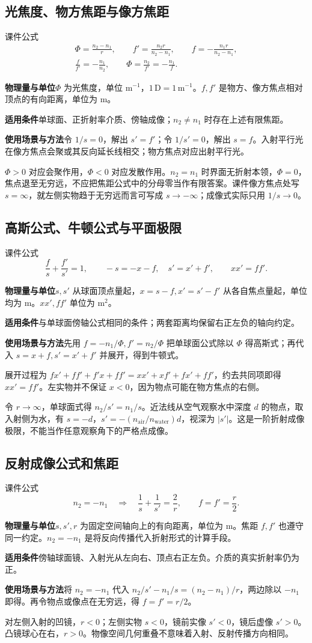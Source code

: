 \documentclass[UTF8,fontset=none,zihao=-4,a4paper]{ctexart}
\newcommand{\unit}[1]{\,\mathrm{#1}}
\newcommand{\explain}[3]{\par\noindent\textbf{物理量与单位}\quad #1\par
\noindent\textbf{适用条件}\quad #2\par
\noindent\textbf{使用场景与方法}\quad #3\par}
\begin{document}
\subsection{光焦度、物方焦距与像方焦距}
\begin{infobox}{课件公式}
\begin{gather*}
 \Phi=\frac{n_2-n_1}{r},\qquad
 f'=\frac{n_2r}{n_2-n_1},\qquad
 f=-\frac{n_1r}{n_2-n_1},\\
 \frac f{f'}=-\frac{n_1}{n_2},\qquad
 \Phi=\frac{n_2}{f'}=-\frac{n_1}{f}.
\end{gather*}
\end{infobox}
\explain{$\Phi$ 为光焦度，单位 $\mathrm{m^{-1}}$，$1\unit D=1\unit{m^{-1}}$。$f,f'$ 是物方、像方焦点相对顶点的有向距离，单位为 m。}{单球面、正折射率介质、傍轴成像；$n_2\ne n_1$ 时存在上述有限焦距。}{令 $1/s=0$，解出 $s'=f'$；令 $1/s'=0$，解出 $s=f$。入射平行光在像方焦点会聚或其反向延长线相交；物方焦点对应出射平行光。}
$\Phi>0$ 对应会聚作用，$\Phi<0$ 对应发散作用。$n_2=n_1$ 时界面无折射本领，$\Phi=0$，焦点退至无穷远，不应把焦距公式中的分母零当作有限答案。课件像方焦点处写 $s=\infty$，就左侧实物趋于无穷远而言可写成 $s\to-\infty$；成像式实际只用 $1/s\to0$。

\subsection{高斯公式、牛顿公式与平面极限}
\begin{infobox}{课件公式}
\[
 \frac fs+\frac{f'}{s'}=1,\qquad
 -s=-x-f,\quad s'=x'+f',\qquad xx'=ff'.
\]
\end{infobox}
\explain{$s,s'$ 从球面顶点量起，$x=s-f,x'=s'-f'$ 从各自焦点量起，单位均为 m。$xx',ff'$ 单位为 $\mathrm{m^2}$。}{与单球面傍轴公式相同的条件；两套距离均保留右正左负的轴向约定。}{先用 $f=-n_1/\Phi,f'=n_2/\Phi$ 把单球面公式除以 $\Phi$ 得高斯式；再代入 $s=x+f,s'=x'+f'$ 并展开，得到牛顿式。}
展开过程为 $fx'+ff'+f'x+ff'=xx'+xf'+fx'+ff'$，约去共同项即得 $xx'=ff'$。左实物并不保证 $x<0$，因为物点可能在物方焦点的右侧。

令 $r\to\infty$，单球面式得 $n_2/s'=n_1/s$。近法线从空气观察水中深度 $d$ 的物点，取入射侧为水，有 $s=-d$，$s'=-(n_{\mathrm{air}}/n_{\mathrm{water}})d$，视深为 $|s'|$。这是一阶折射成像极限，不能当作任意观察角下的严格点成像。

\par\medskip
\subsection{反射成像公式和焦距}
\begin{infobox}{课件公式}
\[
 n_2=-n_1\quad\Longrightarrow\quad
 \frac1s+\frac1{s'}=\frac2r,\qquad f=f'=\frac r2.
\]
\end{infobox}
\explain{$s,s',r$ 为固定空间轴向上的有向距离，单位为 m。焦距 $f,f'$ 也遵守同一约定。$n_2=-n_1$ 是将反向传播代入折射形式的计算手段。}{傍轴球面镜、入射光从左向右、顶点右正左负。介质的真实折射率仍为正。}{将 $n_2=-n_1$ 代入 $n_2/s'-n_1/s=(n_2-n_1)/r$，两边除以 $-n_1$ 即得。再令物点或像点在无穷远，得 $f=f'=r/2$。}
对左侧入射的凹镜，$r<0$；左侧实物 $s<0$，镜前实像 $s'<0$，镜后虚像 $s'>0$。凸镜球心在右，$r>0$。物像空间几何重叠不意味着入射、反射传播方向相同。
\end{document}

